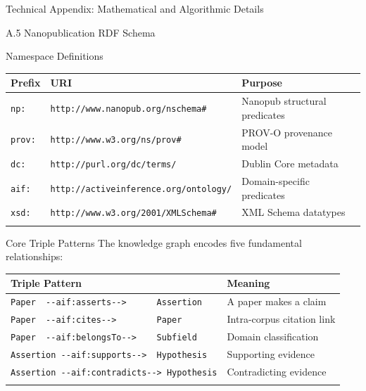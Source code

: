 \documentclass[
  ignorenonframetext,
]{beamer}
\newcounter{none} %
\begin{document}
\begin{frame}[fragile]{Technical Appendix: Mathematical and Algorithmic
Details \label{sec:technical_appendix}}
\begin{block}{A.5 Nanopublication RDF Schema}
\begin{block}{Namespace Definitions}
\protect{}\label{namespace-definitions}
{\def\LTcaptype{none} %
\begin{longtable}[]{@{}
  >{\raggedright\arraybackslash}p{}
  >{\raggedright\arraybackslash}p{}
  >{\raggedright\arraybackslash}p{}@{}}
\toprule\noalign{}
\begin{minipage}[b]{\linewidth}\raggedright
Prefix
\end{minipage} & \begin{minipage}[b]{\linewidth}\raggedright
URI
\end{minipage} & \begin{minipage}[b]{\linewidth}\raggedright
Purpose
\end{minipage} \\
\midrule\noalign{}
\endhead
\texttt{np:} & \texttt{http://www.nanopub.org/nschema\#} & Nanopub
structural predicates \\
\texttt{prov:} & \texttt{http://www.w3.org/ns/prov\#} & PROV-O
provenance model \\
\texttt{dc:} & \texttt{http://purl.org/dc/terms/} & Dublin Core
metadata \\
\texttt{aif:} & \texttt{http://activeinference.org/ontology/} &
Domain-specific predicates \\
\texttt{xsd:} & \texttt{http://www.w3.org/2001/XMLSchema\#} & XML Schema
datatypes \\
\bottomrule\noalign{}
\end{longtable}
}
\end{block}

\begin{block}{Core Triple Patterns}
\protect{}\label{core-triple-patterns}
The knowledge graph encodes five fundamental relationships:

{\def\LTcaptype{none} %
\begin{longtable}[]{@{}ll@{}}
\toprule\noalign{}
Triple Pattern & Meaning \\
\midrule\noalign{}
\endhead
\texttt{Paper\ \ -\/-aif:asserts-\/-\textgreater{}\ \ \ \ \ \ Assertion}
& A paper makes a claim \\
\texttt{Paper\ \ -\/-aif:cites-\/-\textgreater{}\ \ \ \ \ \ \ \ Paper} &
Intra-corpus citation link \\
\texttt{Paper\ \ -\/-aif:belongsTo-\/-\textgreater{}\ \ \ \ Subfield} &
Domain classification \\
\texttt{Assertion\ -\/-aif:supports-\/-\textgreater{}\ \ Hypothesis} &
Supporting evidence \\
\texttt{Assertion\ -\/-aif:contradicts-\/-\textgreater{}\ Hypothesis} &
Contradicting evidence \\
\bottomrule\noalign{}
\end{longtable}
}
\end{block}
\end{block}
\end{frame}
\end{document}
